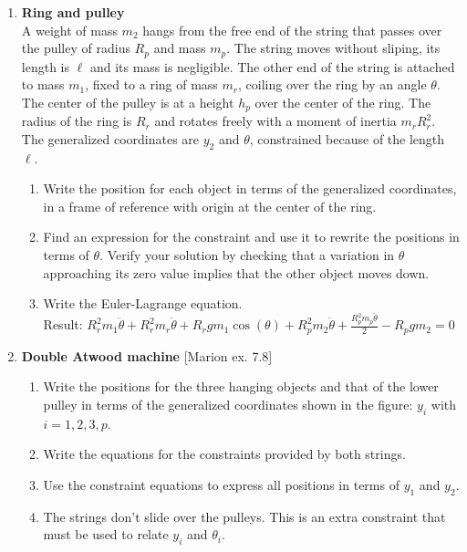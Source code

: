 \documentclass[11pt, a4paper, twoside]{article}
\begin{document}
\begin{enumerate}
	\item 
	\begin{minipage}[t][6cm]{0.57\textwidth}
		\textbf{Ring and pulley}\\
		A weight of mass \(m_2\) hangs from the free end of the string that passes over the pulley of radius \(R_{p}\) and mass \(m_{p}\).
		The string moves without sliping, its length is \(\ell\) and its mass is negligible.
		The other end of the string is attached to mass \(m_1\), fixed to a ring of mass \(m_{r}\), coiling over the ring by an angle \(\theta\).
		The center of the pulley is at a height \(h_{p}\) over the center of the ring. The radius of the ring is \(R_{r}\) and rotates freely with a moment of inertia \(m_{r} R_{r}^2\).
		The generalized coordinates are \(y_{2}\) and \(\theta\), constrained because of the length \(\ell\).
	\end{minipage}
	\begin{minipage}[c][1.5cm][t]{0.2\textwidth}
		
	\end{minipage}
	\begin{enumerate}
		\item Write the position for each object in terms of the generalized coordinates, in a frame of reference with origin at the center of the ring.
		\item Find an expression for the constraint and use it to rewrite the positions in terms of \(\theta\).
		Verify your solution by checking that a variation in \(\theta\) approaching its zero value implies that the other object moves down.
		\item Write the Euler-Lagrange equation.\\
		Result:
		\(
		R_{r}^{2} m_1 \ddot{\theta} + R_{r}^{2} m_{r} \ddot{\theta} + R_{r} g m_1 \cos{\left(\theta \right)} + R_{p}^{2} m_{2} \ddot{\theta} + \frac{R_{p}^{2} m_{p} \ddot{\theta}}{2} - R_{p} g m_{2} = 0
		\)
	\end{enumerate}


	\item
	\begin{minipage}[t][6.8cm]{0.67\textwidth}
		\textbf{Double Atwood machine} [Marion ex. 7.8]\\ 
		\begin{enumerate}
			\item Write the positions for the three hanging objects and that of the lower pulley in terms of the generalized coordinates shown in the figure: \(y_i\) with \(i = 1,2,3,p\). 
			\item Write the equations for the constraints provided by both strings.
			\item Use the constraint equations to express all positions in terms of \(y_1\) and \(y_2\).
			\item The strings don't slide over the pulleys. This is an extra constraint that must be used to relate \(y_i\) and \(\theta_i\).
		\end{enumerate}
	\end{minipage}
	\begin{minipage}[c][0cm][t]{0.3\textwidth}
		
	\end{minipage}


\end{enumerate}
\end{document}
